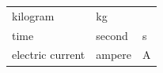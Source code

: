 {{\begin{center}
\begin{xtabular}[t]{|l|l|l|}
        kilogram &
    
    
        kg%
     \tabularnewline{}
    
    
        time &
    
    
        second &
    
    
        s%
     \tabularnewline{}
    
    
        electric current &
    
    
        ampere &
    
    
        A%
     \tabularnewline{}
    

\end{xtabular}
\end{center}}}
